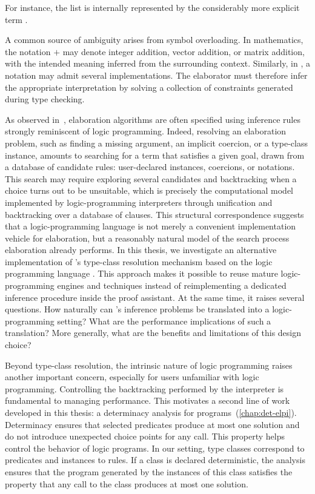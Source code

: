 For instance, the list
\cI{[1;2;3]}
is internally represented by the considerably more explicit term
.

A common source of ambiguity arises from symbol overloading. In mathematics,
the notation \(+\) may denote integer addition, vector addition, or matrix
addition, with the intended meaning inferred from the surrounding context.
Similarly, in \rocq, a notation may admit several implementations. The
elaborator must therefore infer the appropriate interpretation by solving a
collection of constraints generated during type checking.

As observed in~\cite[Chap.~6]{elaboration}, elaboration algorithms are often
specified using inference rules strongly reminiscent of logic programming.
Indeed, resolving an elaboration problem, such as finding a missing
argument, an implicit coercion, or a type-class instance, amounts to
searching for a term that satisfies a given goal, drawn from a database of
candidate rules: user-declared instances, coercions, or notations. This
search may require exploring several candidates and backtracking when a
choice turns out to be unsuitable, which is precisely the computational
model implemented by logic-programming interpreters through unification and
backtracking over a database of clauses. This structural correspondence
suggests that a logic-programming language is not merely a convenient
implementation vehicle for elaboration, but a reasonably natural model of
the search process elaboration already performs. In this thesis, we
investigate an alternative implementation of \rocq's type-class resolution
mechanism based on the logic programming language \elpi. This approach
makes it possible to reuse mature logic-programming engines and techniques
instead of reimplementing a dedicated inference procedure inside the proof
assistant. At the same time, it raises several questions. How naturally can
\rocq's inference problems be translated into a logic-programming setting?
What are the performance implications of such a translation? More
generally, what are the benefits and limitations of this design choice?

Beyond type-class resolution, the intrinsic nature of logic programming raises
another important concern, especially for users unfamiliar with logic
programming. Controlling the backtracking performed by the interpreter is
fundamental to managing performance. This motivates a second line of work
developed in this thesis: a determinacy analysis for \elpi
programs~(\cref{chap:det-elpi}). Determinacy ensures that selected predicates
produce at most one solution and do not introduce unexpected choice points for
any call. This property helps control the behavior of logic programs. In our
setting, type classes correspond to predicates and instances to rules. If a
class is declared deterministic, the analysis ensures that the program generated
by the instances of this class satisfies the property that any call to the class
produces at most one solution.

